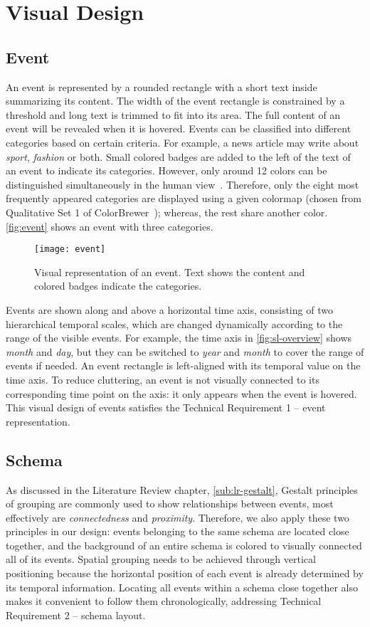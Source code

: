 \section{Visual Design}

\subsection{Event}
An event is represented by a rounded rectangle with a short text inside summarizing its content. The width of the event rectangle is constrained by a threshold and long text is trimmed to fit into its area. The full content of an event will be revealed when it is hovered. Events can be classified into different categories based on certain criteria. For example, a news article may write about \emph{sport}, \emph{fashion} or both. Small colored badges are added to the left of the text of an event to indicate its categories. However, only around 12 colors can be distinguished simultaneously in the human view~\cite{Munzner2014}. Therefore, only the eight most frequently appeared categories are displayed using a given colormap (chosen from Qualitative Set 1 of  ColorBrewer~\cite{Harrower2003}); whereas, the rest share another color. \autoref{fig:event} shows an event with three categories.

\begin{figure}[!htb]
\centering
\texttt{[image: event]}
\caption{Visual representation of an event. Text shows the content and colored badges indicate the categories.}
\label{fig:event}
\end{figure}

Events are shown along and above a horizontal time axis, consisting of two hierarchical temporal scales, which are changed dynamically according to the range of the visible events. For example, the time axis in \autoref{fig:sl-overview} shows \emph{month} and \emph{day}, but they can be switched to \emph{year} and \emph{month} to cover the range of events if needed. An event rectangle is left-aligned with its temporal value on the time axis. To reduce cluttering, an event is not visually connected to its corresponding time point on the axis: it only appears when the event is hovered. This visual design of events satisfies the Technical Requirement 1 -- event representation.

\subsection{Schema}
\label{sub:schema}
As discussed in the Literature Review chapter, \autoref{sub:lr-gestalt}, Gestalt principles of grouping are commonly used to show relationships between events, most effectively are \emph{connectedness} and \emph{proximity}. Therefore, we also apply these two principles in our design: events belonging to the same schema are located close together, and the background of an entire schema is colored to visually connected all of its events. Spatial grouping needs to be achieved through vertical positioning because the horizontal position of each event is already determined by its temporal information. Locating all events within a schema close together also makes it convenient to follow them chronologically, addressing Technical Requirement 2 -- schema layout.

